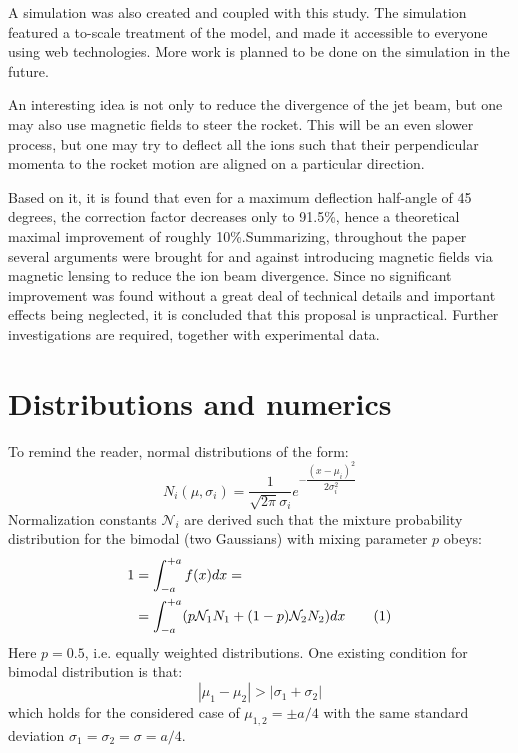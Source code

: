 \documentclass[twocolumn,12pt]{article}
\newcommand\numberthis{\addtocounter{equation}{1}\tag{\theequation}} %
\numberwithin{equation}{section} %
\numberwithin{equation}{section}
\begin{document}
A simulation was also created and coupled with this study. The simulation featured a to-scale treatment of the model, and made it accessible to everyone using web technologies. More work is planned to be done on the simulation in the future. 


An interesting idea is not only to reduce the divergence of the jet beam, but one may also use magnetic fields to steer the rocket. This will be an even slower process, but one may try to deflect all the ions such that their perpendicular momenta to the rocket motion are aligned on a particular direction.

Based on it, it is found that even for a maximum deflection half-angle of 45 degrees, the correction factor decreases only to 91.5\%, hence a theoretical maximal improvement of roughly 10\%.Summarizing, throughout the paper several arguments were brought for and against introducing magnetic fields via magnetic lensing to reduce the ion beam divergence. Since no significant improvement was found without a great deal of technical details and important effects being neglected, it is concluded that this proposal is unpractical. Further investigations are required, together with experimental data.



\newpage
\newpage
\appendix

\section{Distributions and numerics}
\label{appendixnumerical}

To remind the reader, normal distributions of the form:
\begin{equation}
    N_i(\mu,\sigma_i) = \frac{1}{\sqrt{2\pi}\sigma_i} e^{-\dfrac{(x-\mu_i)^2}{2 \sigma_i^2}}
\end{equation}
Normalization constants $\mathcal{N}_i$ are derived such that the mixture probability distribution for the bimodal (two Gaussians) with mixing parameter $p$ obeys:
\begin{align*}
    1 & = \int_{-a}^{+a} f(x)dx = \\
    & = \int_{-a}^{+a} (p \mathcal{N}_1 N_1 + (1-p) \mathcal{N}_2 N_2)dx \numberthis{}
\end{align*}
Here $p =0.5 $, i.e. equally weighted distributions. One existing condition for bimodal distribution is that:
\begin{equation}
    |\mu_1 - \mu_2| > |\sigma_1 + \sigma_2|
\end{equation}
which holds for the considered case of $\mu_{1,2} = \pm a/4$ with the same standard deviation $\sigma_1 = \sigma_2=\sigma = a/4$.
\end{document}
